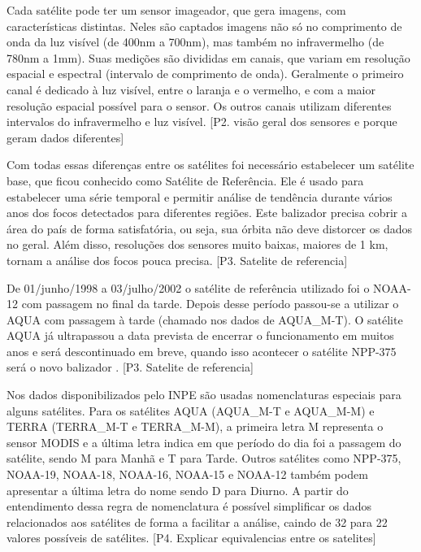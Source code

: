 \documentclass[cic,tc]{iiufrgs}
\begin{document}
Cada satélite pode ter um sensor imageador, que gera imagens, com características
distintas. Neles são captados imagens não só no comprimento de onda da luz
visível (de 400nm a 700nm), mas também no infravermelho (de 780nm a 1mm). 
Suas medições são divididas em canais, que
variam em resolução espacial e espectral (intervalo de comprimento de onda). 
Geralmente o primeiro canal é dedicado à luz visível, entre o laranja e o 
vermelho, e com a maior resolução espacial possível para o sensor. Os outros 
canais utilizam diferentes intervalos do infravermelho e luz visível.
[P2. visão geral dos sensores e porque geram dados diferentes] \par

Com todas essas diferenças entre os satélites foi necessário estabelecer um 
satélite base, que ficou conhecido como Satélite de Referência. Ele é usado 
para estabelecer uma série temporal e permitir análise de tendência durante 
vários anos dos focos detectados para diferentes regiões. 
Este balizador precisa cobrir a área do país de forma
satisfatória, ou seja, sua órbita não deve distorcer os dados no geral. 
Além disso, resoluções dos sensores muito baixas, maiores de 1 km, tornam a 
análise dos focos pouca precisa. [P3. Satelite de referencia] \par

De 01/junho/1998 a 03/julho/2002 o satélite de referência utilizado foi o NOAA-12
com passagem no final da tarde. Depois desse período passou-se a utilizar o 
AQUA com passagem à tarde (chamado nos dados de AQUA\_M-T). O satélite AQUA 
já ultrapassou a data prevista de encerrar o funcionamento em muitos anos e 
será descontinuado em breve, quando isso acontecer o satélite NPP-375 será o novo
balizador \citep{PerguntasFrequentesINPE}. [P3. Satelite de referencia] \par

Nos dados disponibilizados pelo INPE são usadas nomenclaturas especiais para 
alguns satélites. Para os satélites AQUA (AQUA\_M-T e AQUA\_M-M) e TERRA 
(TERRA\_M-T e TERRA\_M-M), a primeira letra M representa o sensor MODIS e a última
letra indica em que período do dia foi a passagem do satélite, sendo M para Manhã 
e T para Tarde. Outros satélites como NPP-375, NOAA-19, NOAA-18, NOAA-16, NOAA-15 
e NOAA-12 também podem apresentar a última letra do nome sendo D para Diurno. 
A partir do entendimento dessa regra de nomenclatura é possível
simplificar os dados relacionados aos satélites de forma a facilitar a análise,
caindo de 32 para 22 valores possíveis de satélites.
[P4. Explicar equivalencias entre os satelites] \par
\end{document}
